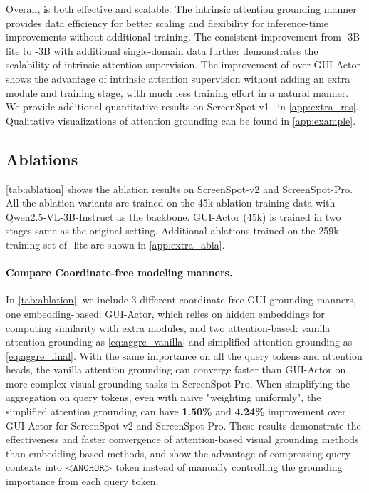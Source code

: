 Overall, \method{} is both effective and scalable. The intrinsic attention grounding manner provides data efficiency for better scaling and flexibility for inference-time improvements without additional training. The consistent improvement from \method{}-3B-lite to \method{}-3B with additional single-domain data further demonstrates the scalability of intrinsic attention supervision. The improvement of \method{} over GUI-Actor shows the advantage of intrinsic attention supervision without adding an extra module and training stage, with much less training effort in a natural manner. We provide additional quantitative results on ScreenSpot-v1~\citep{cheng2024seeclick} in \cref{app:extra_res}. Qualitative visualizations of attention grounding can be found in \cref{app:example}.


\subsection{Ablations}\label{sec:ablation}
\cref{tab:ablation} shows the ablation results on ScreenSpot-v2 and ScreenSpot-Pro. All the ablation variants are trained on the 45k ablation training data with Qwen2.5-VL-3B-Instruct as the backbone. GUI-Actor (45k) is trained in two stages same as the original setting. Additional ablations trained on the 259k training set of \method{}-lite are shown in \cref{app:extra_abla}.

\paragraph{Compare Coordinate-free modeling manners.} In \cref{tab:ablation}, we include 3 different coordinate-free GUI grounding manners, one embedding-based: GUI-Actor, which relies on hidden embeddings for computing similarity with extra modules, and two attention-based: vanilla attention grounding as \cref{eq:aggre_vanilla} and simplified attention grounding as \cref{eq:aggre_final}. With the same importance on all the query tokens and attention heads, the vanilla attention grounding can converge faster than GUI-Actor on more complex visual grounding tasks in ScreenSpot-Pro. When simplifying the aggregation on query tokens, even with naive "weighting uniformly", the simplified attention grounding can have \textbf{1.50\%} and \textbf{4.24\%} improvement over GUI-Actor for ScreenSpot-v2 and ScreenSpot-Pro. These results demonstrate the effectiveness and faster convergence of attention-based visual grounding methods than embedding-based methods, and show the advantage of compressing query contexts into $\texttt{<ANCHOR>}$ token instead of manually controlling the grounding importance from each query token. 
% 


